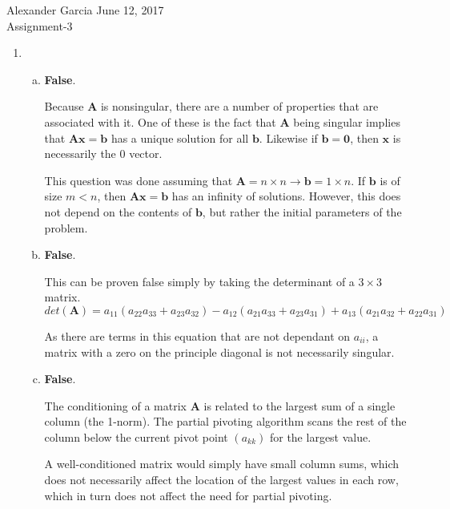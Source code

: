 \documentclass[11pt]{article}
\begin{document}
\lstset{stringstyle=\ttfamily,
	showstringspaces=false,
	basicstyle=\small}

\begin{center} Alexander Garcia \hfill June 12, 2017 \\ Assignment-3 \end{center}

\medskip

\begin{enumerate}

	\item
	\begin{enumerate}[(a)]

		\item \textbf{False}.

		Because $\mathbf{A}$ is nonsingular, there are a number of properties that are associated with it. One of these is the fact that $\mathbf{A}$ being
		singular implies that $\mathbf{Ax = b}$ has a unique solution for all $\mathbf{b}$. Likewise if $\mathbf{b = 0}$, then $\mathbf{x}$ is necessarily the 0
		vector.

		This question was done assuming that $\mathbf{A}=n\times n \rightarrow \mathbf{b}=1\times n$. If $\mathbf{b}$ is of size $m<n$, then $\mathbf{Ax=b}$ has
		an infinity of solutions. However, this does not depend on the contents of $\mathbf{b}$, but rather the initial parameters of the problem.

		\item \textbf{False}.

		This can be proven false simply by taking the determinant of a $3\times 3$ matrix.
		$$det(\mathbf{A}) = a_{11}(a_{22}a_{33} + a_{23}a_{32}) - a_{12}(a_{21}a_{33} + a_{23}a_{31}) + a_{13}(a_{21}a_{32} + a_{22}a_{31})$$

		As there are terms in this equation that are not dependant on $a_{ii}$, a matrix with a zero on the principle diagonal is not necessarily singular.\\

		\item \textbf{False}.

		The conditioning of a matrix $\mathbf{A}$ is related to the largest sum of a single column (the 1-norm). The partial pivoting algorithm scans the rest of the
		column below the current pivot point $(a_{kk})$ for the largest value.

		A well-conditioned matrix would simply have small column sums, which does not necessarily affect the location of the largest values in each row, which in turn
		does not affect the need for partial pivoting. \\


\end{enumerate}
\end{enumerate}
\end{document}

